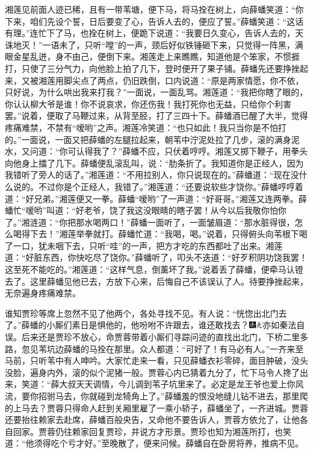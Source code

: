 湘莲见前面人迹已稀，且有一带苇塘，便下马，将马拴在树上，向薛蟠笑道：``你下来，咱们先设个誓，日后要变了心，告诉人去的，便应了誓。''薛蟠笑道：``这话有理。''连忙下了马，也拴在树上，便跪下说道：``我要日久变心，告诉人去的，天诛地灭！''一语未了，只听``嘡''的一声，颈后好似铁锤砸下来，只觉得一阵黑，满眼金星乱迸，身不由己，便倒下来。湘莲走上来瞧瞧，知道他是个笨家，不惯捱打，只使了三分气力，向他脸上拍了几下，登时便开了果子铺。薛蟠先还要挣挫起来，又被湘莲用脚尖点了两点，仍旧跌倒，口内说道：``原是两家情愿，你不依，只好说，为什么哄出我来打我？''一面说，一面乱骂。湘莲道：``我把你瞎了眼的，你认认柳大爷是谁！你不说哀求，你还伤我！我打死你也无益，只给你个利害罢。''说着，便取了马鞭过来，从背至胫，打了三四十下。薛蟠酒已醒了大半，觉得疼痛难禁，不禁有``嗳哟''之声。湘莲冷笑道：``也只如此！我只当你是不怕打的。''一面说，一面又把薛蟠的左腿拉起来，朝苇中泞泥处拉了几步，滚的满身泥水，又问道：``你可认得我了？''薛蟠不应，只伏着哼哼。湘莲又掷下鞭子，用拳头向他身上擂了几下。薛蟠便乱滚乱叫，说：``肋条折了。我知道你是正经人，因为我错听了旁人的话了。''湘莲道：``不用拉别人，你只说现在的。''薛蟠道：``现在没什么说的。不过你是个正经人，我错了。''湘莲道：``还要说软些才饶你。''薛蟠哼哼着道：``好兄弟。''湘莲便又一拳。薛蟠``嗳哟''了一声道：``好哥哥。''湘莲又连两拳。薛蟠忙``嗳哟''叫道：``好老爷，饶了我这没眼睛的瞎子罢！从今以后我敬你怕你了。''湘涟道：``你把那水喝两口！''薛蟠一面听了，一面皱眉道：``那水脏得很，怎么喝得下去！''湘莲举拳就打。薛蟠忙道：``我喝，喝。''说着，只得俯头向苇根下喝了一口，犹未咽下去，只听``哇''的一声，把方才吃的东西都吐了出来。湘莲道：``好脏东西，你快吃尽了饶你。''薛蟠听了，叩头不迭道：``好歹积阴功饶我罢！这至死不能吃的。''湘莲道：``这样气息，倒薰坏了我。''说着丢了薛蟠，便牵马认镫去了。这里薛蟠见他已去，方放下心来，后悔自己不该误认了人。待要挣挫起来，无奈遍身疼痛难禁。

谁知贾珍等席上忽然不见了他两个，各处寻找不见。有人说：``恍惚出北门去了。''薛蟠的小厮们素日是惧他的，他吩咐不许跟去，谁还敢找去？{\includegraphics[width=3mm]{../Images/00004}\includegraphics[width=3mm]{../Images/00012}\footnotesize \kaishu 亦如秦法自误。}后来还是贾珍不放心，命贾蓉带着小厮们寻踪问迹的直找出北门，下桥二里多路，忽见苇坑边薛蟠的马拴在那里。众人都道：``可好了！有马必有人。''一齐来至马前，只听苇中有人呻吟。大家忙走来一看，只见薛蟠衣衫零碎，面目肿破，没头没脸，遍身内外，滚的似个泥猪一般。贾蓉心内已猜着九分了，忙下马令人搀了出来，笑道：``薛大叔天天调情，今儿调到苇子坑里来了。必定是龙王爷也爱上你风流，要你招驸马去，你就碰到龙犄角上了。''薛蟠羞的恨没地缝儿钻不进去，那里爬的上马去？贾蓉只得命人赶到关厢里雇了一乘小轿子，薛蟠坐了，一齐进城。贾蓉还要抬往赖家去赴席，薛蟠百般央告，又命他不要告诉人，贾蓉方依允了，让他各自回家。贾蓉仍往赖家回复贾珍，并说方才形景。贾珍也知为湘莲所打，也笑道：``他须得吃个亏才好。''至晚散了，便来问候。薛蟠自在卧房将养，推病不见。

